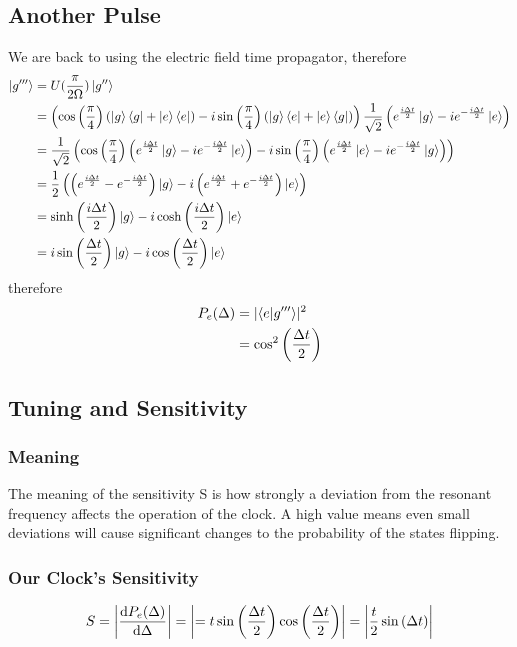 \subsection{Another Pulse}
We are back to using the electric field time propagator, therefore
\begin{align}
	\ket{g'''} &= U(\frac{\pi}{2\Omega})\ket{g''}\\
	&= \left(\cos\left(\frac{\pi}{4}\right)\left(\left\lvert g\right\rangle\left\langle g\right\rvert+\left\lvert e\right\rangle\left\langle e\right\rvert\right)-i\sin\left(\frac{\pi}{4}\right)\left(\left\lvert g\right\rangle\left\langle e\right\rvert+\left\lvert e\right\rangle\left\langle g\right\rvert\right)\right)\frac{1}{\sqrt{2}}\left(e^{\frac{i\Delta t}{2}}\ket{g}-ie^{-\frac{i\Delta t}{2}}\ket{e}\right)\\
	&= \frac{1}{\sqrt{2}}\left(\cos\left(\frac{\pi}{4}\right)\left(e^{\frac{i\Delta t}{2}}\ket{g}-ie^{-\frac{i\Delta t}{2}}\ket{e}\right)-i\sin\left(\frac{\pi}{4}\right)\left(e^{\frac{i\Delta t}{2}}\ket{e}-ie^{-\frac{i\Delta t}{2}}\ket{g}\right)\right)\\
	&= \frac{1}{2}\left(\left(e^{\frac{i\Delta t}{2}}-e^{-\frac{i\Delta t}{2}}\right)\ket{g}-i\left(e^{\frac{i\Delta t}{2}}+e^{-\frac{i\Delta t}{2}}\right)\ket{e}\right)\\
	&= \sinh\left(\frac{i\Delta t}{2}\right)\ket{g}-i\cosh\left(\frac{i\Delta t}{2}\right)\ket{e}\\
	&= i\sin\left(\frac{\Delta t}{2}\right)\ket{g}-i\cos\left(\frac{\Delta t}{2}\right)\ket{e}
\end{align}
therefore
\begin{align}
	P_e(\Delta) &= \lvert\braket{e|g'''}\rvert^2\\
	&= \cos^2\left(\frac{\Delta t}{2}\right)
\end{align}

\subsection{Tuning and Sensitivity}
\subsubsection{Meaning}

The meaning of the sensitivity S is how strongly a deviation from the resonant frequency affects the operation of the clock. A high value means even small deviations will cause significant changes to the probability of the states flipping.

\subsubsection{Our Clock's Sensitivity}

\begin{equation}
	S = \left\lvert\diff{P_e(\Delta)}{\Delta}\right\rvert=\left\lvert=t\sin\ins{\frac{\Delta t}{2}}\cos\ins{\frac{\Delta t}{2}}\right\rvert = \left\lvert \frac{t}{2}\sin\ins{\Delta t}\right\rvert 
\end{equation}

